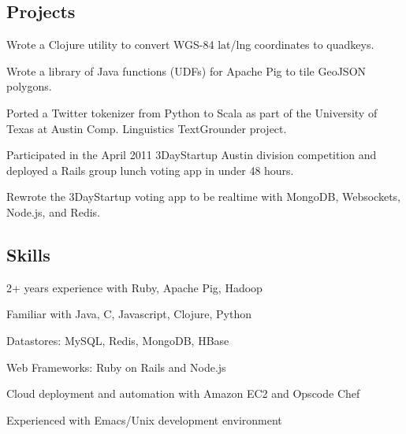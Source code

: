 \documentclass[10pt,letterpaper]{article}
\newenvironment{indentsection}[1]%
{\begin{list}{}%
  {\setlength{\leftmargin}{#1}}%
  \item[]%
}
{\end{list}}
\begin{document}
\vspace{-0.4em}
\subsection*{Projects}

\begin{indentsection}{\parindent}
\begin{itemize*}
        \item Wrote a Clojure utility to convert WGS-84 lat/lng coordinates to quadkeys.
  \item Wrote a library of Java functions (UDFs) for Apache Pig to tile GeoJSON polygons.          
        \item Ported a Twitter tokenizer from Python to Scala as part of the University of Texas at Austin Comp. Linguistics TextGrounder project.
        \item Participated in the April 2011 3DayStartup Austin division competition and deployed a Rails group lunch voting app in under 48 hours.
        \item Rewrote the 3DayStartup voting app to be realtime with MongoDB, Websockets, Node.js, and Redis.
\end{itemize*}
\end{indentsection}

\vspace{-0.4em}
\subsection*{Skills}

\begin{indentsection}{\parindent}
\begin{itemize*}
        \item 2+ years experience with Ruby, Apache Pig, Hadoop
        \item Familiar with Java, C, Javascript, Clojure, Python                    
        \item Datastores: MySQL, Redis, MongoDB, HBase
        \item Web Frameworks: Ruby on Rails and Node.js      
        \item Cloud deployment and automation with Amazon EC2 and Opscode Chef
        \item Experienced with Emacs/Unix development environment
\end{itemize*}
\end{indentsection}
\end{document}
